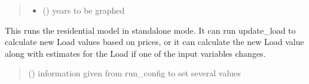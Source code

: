 \documentclass[letterpaper,10pt,english]{sphinxmanual}
\begin{document}
\begin{fulllineitems}
\begin{fulllineitems}
\begin{quote}
\begin{description}
\begin{itemize}
\item {} 
\sphinxAtStartPar
{} (\sphinxstyleliteralemphasis{\sphinxupquote{{[}}}\sphinxstyleliteralemphasis{\sphinxupquote{{]}}}\sphinxstyleliteralemphasis{\sphinxupquote{, }}) \textendash{} years to be graphed

\end{itemize}

\end{description}\end{quote}

\end{fulllineitems}


\end{fulllineitems}


\begin{fulllineitems}
\label{\detokenize{src.models.residential.scripts.residential:src.models.residential.scripts.residential.run_residential}}
\pysigstartsignatures
\pysiglinewithargsret
{}
{}
{}
\pysigstopsignatures
\sphinxAtStartPar
This runs the residential model in stand\sphinxhyphen{}alone mode. It can run update\_load to calculate new
Load values based on prices, or it can calculate the new Load value along with estimates for
the Load if one of the input variables changes.
\begin{quote}\begin{description}
\sphinxAtStartPar
{} ({\hyperref[\detokenize{src.common.config_setup:src.common.config_setup.Config_settings}]{}}) \textendash{} information given from run\_config to set several values

\end{description}\end{quote}

\end{fulllineitems}
\end{document}

